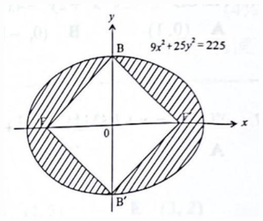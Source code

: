 \documentclass[10pt]{article}
\begin{document}
\begin{enumerate}
\begin{center}
\includegraphics[max width=\textwidth]{2024_06_05_971e6815482d5ecd2718g-30}
\end{center}
\end{enumerate}
\end{document}
